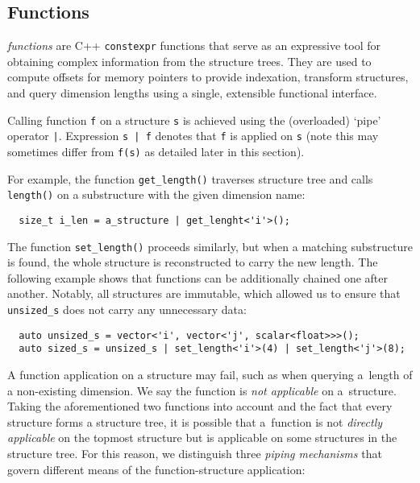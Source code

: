 \subsection{Functions}

\Noarr{} \emph{functions} are C++ \texttt{constexpr} functions that serve as an expressive tool for obtaining complex information from the structure trees. They are used to compute offsets for memory pointers to provide indexation, transform structures, and query dimension lengths using a single, extensible functional interface.

Calling function \texttt{f} on a structure \texttt{s} is achieved using the (overloaded) `pipe' operator \texttt{|}. Expression \texttt{s | f} denotes that \texttt{f} is applied on \texttt{s} (note this may sometimes differ from \texttt{f(s)} as detailed later in this section).

For example, the function \texttt{get\_length()} traverses structure tree and calls \texttt{length()} on a substructure with the given dimension name:
\begin{verbatim}
  size_t i_len = a_structure | get_lenght<'i'>();
\end{verbatim}

The function \texttt{set\_length()} proceeds similarly, but when a matching substructure is found, the whole structure is reconstructed to carry the new length. The following example shows that functions can be additionally chained one after another. Notably, all structures are immutable, which allowed us to ensure that \texttt{unsized\_s} does not carry any unnecessary data:
\begin{verbatim}
  auto unsized_s = vector<'i', vector<'j', scalar<float>>>();
  auto sized_s = unsized_s | set_length<'i'>(4) | set_length<'j'>(8);
\end{verbatim}

A function application on a structure may fail, such as when querying a~length of a non-existing dimension. We say the function is \emph{not applicable} on a~structure. Taking the aforementioned two functions into account and the fact that every structure forms a structure tree, it is possible that a~function is not \emph{directly applicable} on the topmost structure but is applicable on some structures in the structure tree. For this reason, we distinguish three \emph{piping mechanisms} that govern different means of the function-structure application:

